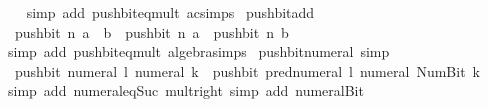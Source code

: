 \begin{isabellebody}
%
\isadelimproof
\ \ %
\endisadelimproof
%
\isatagproof
{}\isamarkupfalse%
\ {\isacharparenleft}{\kern0pt}simp\ add{\isacharcolon}{\kern0pt}\ push{\isacharunderscore}{\kern0pt}bit{\isacharunderscore}{\kern0pt}eq{\isacharunderscore}{\kern0pt}mult\ ac{\isacharunderscore}{\kern0pt}simps{\isacharparenright}{\kern0pt}%
\endisatagproof
{\isafoldproof}%
%
\isadelimproof
\isanewline
%
\endisadelimproof
\isanewline
{}\isamarkupfalse%
\ push{\isacharunderscore}{\kern0pt}bit{\isacharunderscore}{\kern0pt}add{\isacharcolon}{\kern0pt}\isanewline
\ \ {\isachardoublequoteopen}push{\isacharunderscore}{\kern0pt}bit\ n\ {\isacharparenleft}{\kern0pt}a\ {\isacharplus}{\kern0pt}\ b{\isacharparenright}{\kern0pt}\ {\isacharequal}{\kern0pt}\ push{\isacharunderscore}{\kern0pt}bit\ n\ a\ {\isacharplus}{\kern0pt}\ push{\isacharunderscore}{\kern0pt}bit\ n\ b{\isachardoublequoteclose}\isanewline
%
\isadelimproof
\ \ %
\endisadelimproof
%
\isatagproof
{}\isamarkupfalse%
\ {\isacharparenleft}{\kern0pt}simp\ add{\isacharcolon}{\kern0pt}\ push{\isacharunderscore}{\kern0pt}bit{\isacharunderscore}{\kern0pt}eq{\isacharunderscore}{\kern0pt}mult\ algebra{\isacharunderscore}{\kern0pt}simps{\isacharparenright}{\kern0pt}%
\endisatagproof
{\isafoldproof}%
%
\isadelimproof
\isanewline
%
\endisadelimproof
\isanewline
{}\isamarkupfalse%
\ push{\isacharunderscore}{\kern0pt}bit{\isacharunderscore}{\kern0pt}numeral\ {\isacharbrackleft}{\kern0pt}simp{\isacharbrackright}{\kern0pt}{\isacharcolon}{\kern0pt}\isanewline
\ \ {\isacartoucheopen}push{\isacharunderscore}{\kern0pt}bit\ {\isacharparenleft}{\kern0pt}numeral\ l{\isacharparenright}{\kern0pt}\ {\isacharparenleft}{\kern0pt}numeral\ k{\isacharparenright}{\kern0pt}\ {\isacharequal}{\kern0pt}\ push{\isacharunderscore}{\kern0pt}bit\ {\isacharparenleft}{\kern0pt}pred{\isacharunderscore}{\kern0pt}numeral\ l{\isacharparenright}{\kern0pt}\ {\isacharparenleft}{\kern0pt}numeral\ {\isacharparenleft}{\kern0pt}Num{\isachardot}{\kern0pt}Bit{}\ k{\isacharparenright}{\kern0pt}{\isacharparenright}{\kern0pt}{\isacartoucheclose}\isanewline
%
\isadelimproof
\ \ %
\endisadelimproof
%
\isatagproof
{}\isamarkupfalse%
\ {\isacharparenleft}{\kern0pt}simp\ add{\isacharcolon}{\kern0pt}\ numeral{\isacharunderscore}{\kern0pt}eq{\isacharunderscore}{\kern0pt}Suc\ mult{\isacharunderscore}{\kern0pt}{}{\isacharunderscore}{\kern0pt}right{\isacharparenright}{\kern0pt}\ {\isacharparenleft}{\kern0pt}simp\ add{\isacharcolon}{\kern0pt}\ numeral{\isacharunderscore}{\kern0pt}Bit{}{\isacharparenright}{\kern0pt}%

\end{isabellebody}

